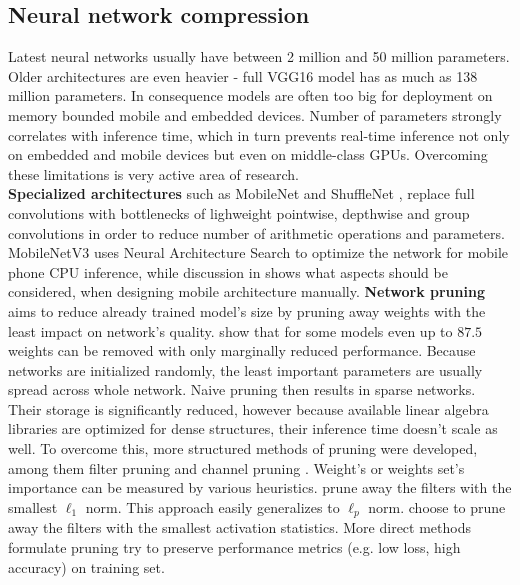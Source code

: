 \documentclass[../Main.tex]{subfiles}
\begin{document}
\subsection{Neural network compression}
    Latest neural networks usually have between 2 million and 50 million parameters.
    Older architectures are even heavier - full VGG16 model has as much as
    138 million parameters. In consequence models 
    are often too big for deployment on memory bounded mobile and embedded devices.
    Number of parameters strongly correlates with inference time, which in turn
    prevents real-time inference not only on embedded and mobile
    devices but even on middle-class GPUs. Overcoming these limitations 
    is very active area of research.\\
    \textbf{Specialized architectures} such as MobileNet \cite{mobilenetv1, 
    mobilenetv2, mobilenetv3} and ShuffleNet \cite{shufflenetv1,
    shufflenetv2}, replace full convolutions with bottlenecks of lighweight
    pointwise, depthwise and group convolutions in order to reduce number of 
    arithmetic operations and parameters. MobileNetV3 \cite{mobilenetv3} uses
    Neural Architecture Search to optimize the network for mobile phone CPU
    inference, while discussion in \cite{shufflenetv2} shows what aspects should
    be considered, when designing mobile architecture manually. 
    \textbf{Network pruning} aims to reduce already trained model's size by pruning away
    weights with the least impact on network's quality. \cite{zhu2017prune} show
    that for some models even up to $87.5$ weights can be removed with only 
    marginally reduced performance. 
    Because networks are initialized randomly, the least
    important parameters are usually spread across whole network. Naive pruning 
    then results in sparse networks. Their storage is significantly reduced, however
    because available linear algebra libraries are optimized for dense structures,
    their inference time doesn't scale as well. To overcome this, more structured
    methods of pruning were developed, among them filter pruning \cite{li2016pruning, molchanov2016pruning}
    and channel pruning \cite{he2017channel}. 
    Weight's or weights set's importance can be measured by various heuristics. 
    \cite{li2016pruning} prune away the filters with the smallest $\ell_1$ norm.
    This approach easily generalizes to $\ell_p$ norm.
    \cite{polyak2015} choose to prune away the filters with
    the smallest activation statistics. More direct methods formulate pruning 
    try to preserve performance metrics (e.g. low loss, high accuracy) on training set. 
\end{document}
